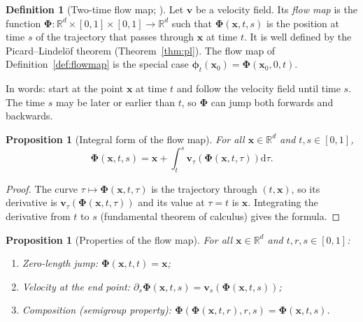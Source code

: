 \documentclass[11pt,a4paper]{article}
\numberwithin{equation}{section}     %
\theoremstyle{plain}        %
\newtheorem{proposition}[theorem]{Proposition}
\theoremstyle{definition}   %
\newtheorem{definition}[theorem]{Definition}
\theoremstyle{remark}       %
\begin{document}
\begin{definition}[Two-time flow map; \citealp{boffi2024flowmap}]\label{def:flowmap2}
Let $\mathbf{v}$ be a velocity field. Its \emph{flow map} is the function $\boldsymbol{\Phi}:\mathbb{R}^d\times[0,1]\times[0,1]\to\mathbb{R}^d$ such that $\boldsymbol{\Phi}(\mathbf{x},t,s)$ is the position at time $s$ of the trajectory that passes through $\mathbf{x}$ at time $t$. It is well defined by the Picard--Lindel\"of theorem (Theorem~\ref{thm:pl}). The flow map of Definition~\ref{def:flowmap} is the special case $\boldsymbol{\phi}_t(\mathbf{x}_0)=\boldsymbol{\Phi}(\mathbf{x}_0,0,t)$.
\end{definition}

In words: start at the point $\mathbf{x}$ at time $t$ and follow the velocity field until time $s$. The time $s$ may be later or earlier than $t$, so $\boldsymbol{\Phi}$ can jump both forwards and backwards.

\begin{proposition}[Integral form of the flow map]\label{prop:flowintegral}
For all $\mathbf{x}\in\mathbb{R}^d$ and $t,s\in[0,1]$,
\[
\boldsymbol{\Phi}(\mathbf{x},t,s)=\mathbf{x}+\int_t^s\mathbf{v}_\tau\left(\boldsymbol{\Phi}(\mathbf{x},t,\tau)\right)\mathrm{d}\tau .
\]
\end{proposition}

\begin{proof}
The curve $\tau\mapsto\boldsymbol{\Phi}(\mathbf{x},t,\tau)$ is the trajectory through $(t,\mathbf{x})$, so its derivative is $\mathbf{v}_\tau(\boldsymbol{\Phi}(\mathbf{x},t,\tau))$ and its value at $\tau=t$ is $\mathbf{x}$. Integrating the derivative from $t$ to $s$ (fundamental theorem of calculus) gives the formula.
\end{proof}

\begin{proposition}[Properties of the flow map]\label{prop:flowprops}
For all $\mathbf{x}\in\mathbb{R}^d$ and $t,r,s\in[0,1]$:
\begin{enumerate}[label=(\alph*)]
\item \emph{Zero-length jump:} $\boldsymbol{\Phi}(\mathbf{x},t,t)=\mathbf{x}$;
\item \emph{Velocity at the end point:} $\partial_s\boldsymbol{\Phi}(\mathbf{x},t,s)=\mathbf{v}_s\left(\boldsymbol{\Phi}(\mathbf{x},t,s)\right)$;
\item \emph{Composition (semigroup property):} $\boldsymbol{\Phi}\left(\boldsymbol{\Phi}(\mathbf{x},t,r),r,s\right)=\boldsymbol{\Phi}(\mathbf{x},t,s)$.
\end{enumerate}
\end{proposition}
\end{document}
